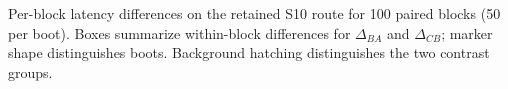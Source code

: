 \caption{Per-block latency differences on the retained S10 route for 100 paired blocks (50 per boot). Boxes summarize within-block differences for $\Delta_{BA}$ and $\Delta_{CB}$; marker shape distinguishes boots. Background hatching distinguishes the two contrast groups.}
